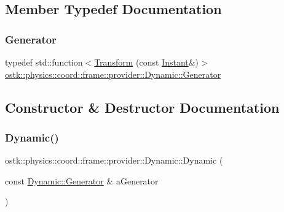 \subsection{Member Typedef Documentation}
\mbox{\label{classostk_1_1physics_1_1coord_1_1frame_1_1provider_1_1_dynamic_a1627a4b4e00ddcb81b50d3cabec711e8}} 
\subsubsection{\texorpdfstring{Generator}{Generator}}
{\footnotesize\ttfamily typedef std\+::function$<$\hyperlink{classostk_1_1physics_1_1coord_1_1_transform}{Transform} (const \hyperlink{classostk_1_1physics_1_1time_1_1_instant}{Instant}\&)$>$ \hyperlink{classostk_1_1physics_1_1coord_1_1frame_1_1provider_1_1_dynamic_a1627a4b4e00ddcb81b50d3cabec711e8}{ostk\+::physics\+::coord\+::frame\+::provider\+::\+Dynamic\+::\+Generator}}



\subsection{Constructor \& Destructor Documentation}
\mbox{\label{classostk_1_1physics_1_1coord_1_1frame_1_1provider_1_1_dynamic_a4a2d8961bc1ed12a2eafdf0c099a254f}} 
\subsubsection{\texorpdfstring{Dynamic()}{Dynamic()}}
{\footnotesize\ttfamily ostk\+::physics\+::coord\+::frame\+::provider\+::\+Dynamic\+::\+Dynamic (\begin{DoxyParamCaption}\item[{const \hyperlink{classostk_1_1physics_1_1coord_1_1frame_1_1provider_1_1_dynamic_a1627a4b4e00ddcb81b50d3cabec711e8}{Dynamic\+::\+Generator} \&}]{a\+Generator }\end{DoxyParamCaption})}

